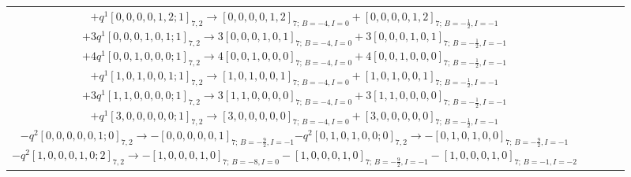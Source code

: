 \documentclass{article}
\begin{document}
\begin{landscape}
\begin{longtable}{c p{0.39\linewidth} p{0.52\linewidth}}
$+q^{1}[0,0,0,0,1,2;1]_{7,2}\longrightarrow [0,0,0,0,1,2]_{7;\,B=-4,I=0} +[0,0,0,0,1,2]_{7;\,B=-\frac{1}{2},I=-1}$\newline $+3q^{1}[0,0,0,1,0,1;1]_{7,2}\longrightarrow 3[0,0,0,1,0,1]_{7;\,B=-4,I=0} +3[0,0,0,1,0,1]_{7;\,B=-\frac{1}{2},I=-1}$\newline $+4q^{1}[0,0,1,0,0,0;1]_{7,2}\longrightarrow 4[0,0,1,0,0,0]_{7;\,B=-4,I=0} +4[0,0,1,0,0,0]_{7;\,B=-\frac{1}{2},I=-1}$\newline $+q^{1}[1,0,1,0,0,1;1]_{7,2}\longrightarrow [1,0,1,0,0,1]_{7;\,B=-4,I=0} +[1,0,1,0,0,1]_{7;\,B=-\frac{1}{2},I=-1}$\newline $+3q^{1}[1,1,0,0,0,0;1]_{7,2}\longrightarrow 3[1,1,0,0,0,0]_{7;\,B=-4,I=0} +3[1,1,0,0,0,0]_{7;\,B=-\frac{1}{2},I=-1}$\newline $+q^{1}[3,0,0,0,0,0;1]_{7,2}\longrightarrow [3,0,0,0,0,0]_{7;\,B=-4,I=0} +[3,0,0,0,0,0]_{7;\,B=-\frac{1}{2},I=-1}$\newline $-q^{2}[0,0,0,0,0,1;0]_{7,2}\longrightarrow -[0,0,0,0,0,1]_{7;\,B=-\frac{9}{2},I=-1}$\newline $-q^{2}[0,1,0,1,0,0;0]_{7,2}\longrightarrow -[0,1,0,1,0,0]_{7;\,B=-\frac{9}{2},I=-1}$\newline $-q^{2}[1,0,0,0,1,0;2]_{7,2}\longrightarrow -[1,0,0,0,1,0]_{7;\,B=-8,I=0} -[1,0,0,0,1,0]_{7;\,B=-\frac{9}{2},I=-1} -[1,0,0,0,1,0]_{7;\,B=-1,I=-2}$ \\

\end{longtable}
\end{landscape}
\end{document}
